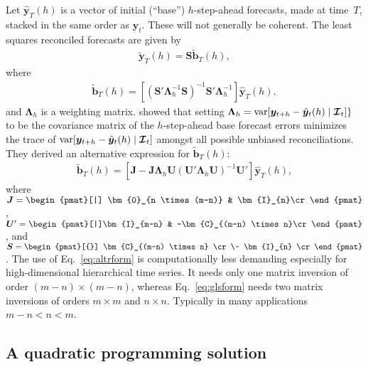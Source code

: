 \documentclass[11pt]{article}
\newcommand{\var}{\textnormal{var}}
\newcommand{\bS}{\bm{S}}
\newcommand{\bC}{\bm{C}}
\newcommand{\bI}{\bm{I}}
\newcommand{\0}{\phantom{0}}
\begin{document}
Let $\hat{\bm{y}}_T(h)$ is a vector of initial (``base'') $h$-step-ahead forecasts, made at time~$T$, stacked in the same order as $\bm{y}_t$. These will not generally be coherent. The least squares reconciled forecasts are given by
\begin{align*}
\tilde{\bm{y}}_{T}(h) = \bm{S}\tilde{\bm{b}}_{T}(h),
\end{align*}
where
\begin{align}
\tilde{\bm{b}}_{T}(h) = \left[(\bm{S}'\bm{\Lambda}_{h}^{-1}\bm{S})^{-1}\bm{S}'\bm{\Lambda}_{h}^{-1}\right]\hat{\bm{y}}_{T}(h),
\label{eq:glsform}
\end{align}
and $\bm{\Lambda}_h$ is a weighting matrix. \citet{Wick2018} showed that setting $\bm{\Lambda}_h =\var[\bm{y}_{t+h} - \hat{\bm{y}}_{t}(h)\mid\bm{\mathcal{I}}_{t}]\}$ to be the covariance matrix of the $h$-step-ahead base forecast errors minimizes the trace of
$\var[\bm{y}_{t+h} - \tilde{\bm{y}}_{t}(h)\mid \bm{\mathcal{I}}_{t}]$ amongst all possible unbiased reconciliations. They derived an alternative expression for $\tilde{\bm{b}}_{T}(h)$:
\begin{align}
\tilde{\bm{b}}_{T}(h) = \left[\bm{J} - \bm{J}\bm{\Lambda}_h\bm{U}(\bm{U}'\bm{\Lambda}_h\bm{U})^{-1}\bm{U}'\right]\hat{\bm{y}}_{T}(h),
\label{eq:altrform}
\end{align}
where $\bm{J} = \begin{pmat}[|] \bm{0}_{n \times (m-n)} & \bI_{n}\cr\end{pmat}$,\quad
$\bm{U}' = \begin{pmat}[|]\bI_{m-n}  & -\bC_{(m-n) \times n}\cr\end{pmat}$,
and $\bS = \begin{pmat}[{}]
\bC_{(m-n) \times n} \cr\-
\bI_{n} \cr
\end{pmat}$. The use of Eq.~\eqref{eq:altrform} is computationally less demanding especially for high-dimensional hierarchical time series. It needs only one matrix inversion of order $(m - n) \times (m - n)$, whereas Eq.~\eqref{eq:glsform} needs two matrix inversions of orders $m \times m$ and $n \times n$. Typically in many applications $m-n < n < m$.

\subsection{A quadratic programming solution}
\end{document}
